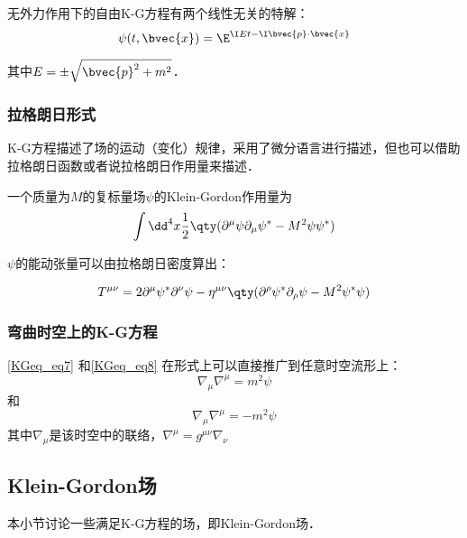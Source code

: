 无外力作用下的自由K-G方程有两个线性无关的特解：
\begin{equation}
\psi(t, \bvec{x}) = \E^{\I Et-\I \bvec{p}\cdot\bvec{x}}
\end{equation}

其中$E=\pm\sqrt{\bvec{p}^2+m^2}$．





\subsubsection{拉格朗日形式}


K-G方程描述了场的运动（变化）规律，采用了微分语言进行描述，但也可以借助拉格朗日函数或者说拉格朗日作用量来描述．

一个质量为$M$的复标量场$\psi$的Klein-Gordon作用量为
\begin{equation}
\int {\dd}^4 x \frac{1}{2}\qty(\partial^\mu\psi\partial_\mu\psi^*-M^2\psi\psi^*)
\end{equation}

$\psi$的能动张量可以由拉格朗日密度算出：

\begin{equation}
T^{\mu\nu} = 2\partial^\mu\psi^*\partial^\nu\psi-\eta^{\mu\nu}\qty(\partial^\rho\psi^*\partial_\rho\psi-M^2\psi^*\psi)
\end{equation}


\subsubsection{弯曲时空上的K-G方程}

\autoref{KGeq_eq7} 和\autoref{KGeq_eq8} 在形式上可以直接推广到任意时空流形上：
\begin{equation}
\nabla_\mu\nabla^\mu=m^2\psi
\end{equation}
和
\begin{equation}
\nabla_\mu\nabla^\mu=-m^2\psi
\end{equation}
其中$\nabla_\mu$是该时空中的联络，$\nabla^\mu=g^{\mu\nu}\nabla_\nu$





\subsection{Klein-Gordon场}\label{KGeq_sub1}

本小节讨论一些满足K-G方程的场，即Klein-Gordon场．


























